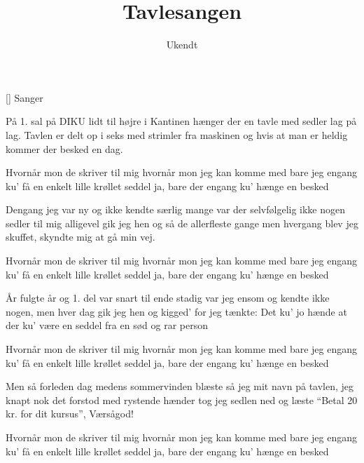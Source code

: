 \documentclass[a4paper,11pt]{article}
\title{Tavlesangen}
\author{Ukendt}
\begin{document}
\maketitle

\begin{roles}
[] Sanger 
\end{roles}

\begin{song}
   På 1. sal på DIKU
            lidt til højre i Kantinen
            hænger der en tavle med sedler lag på lag.
            Tavlen er delt op i seks
            med strimler fra maskinen
            og hvis at man er heldig kommer der besked en dag.

   Hvornår mon de skriver til mig
            hvornår mon jeg kan komme med
            bare jeg engang ku' få
            en enkelt lille krøllet seddel
            ja, bare der engang ku' hænge en besked

   Dengang jeg var ny
            og ikke kendte særlig mange
            var der selvfølgelig ikke nogen sedler til mig
            alligevel gik jeg hen og så
            de allerfleste gange
            men hvergang blev jeg skuffet, skyndte mig at gå min vej.

   Hvornår mon de skriver til mig
            hvornår mon jeg kan komme med
            bare jeg engang ku' få
            en enkelt lille krøllet seddel
            ja, bare der engang ku' hænge en besked

   År fulgte år og
            1. del var snart til ende
            stadig var jeg ensom og kendte ikke nogen,
            men hver dag gik jeg hen og kigged'
            for jeg tænkte: Det ku' jo hænde
            at der ku' være en seddel fra en sød og rar person

   Hvornår mon de skriver til mig
            hvornår mon jeg kan komme med
            bare jeg engang ku' få
            en enkelt lille krøllet seddel
            ja, bare der engang ku' hænge en besked

   Men så forleden dag
            medens sommervinden blæste
            så jeg mit navn på tavlen, jeg knapt nok det forstod
            med rystende hænder
            tog jeg sedlen ned og læste
            ``Betal 20 kr. for dit kursus'', Værsågod!

   Hvornår mon de skriver til mig
            hvornår mon jeg kan komme med
            bare jeg engang ku' få
            en enkelt lille krøllet seddel
            ja, bare der engang ku' hænge en besked

\end{song}
\end{document}
